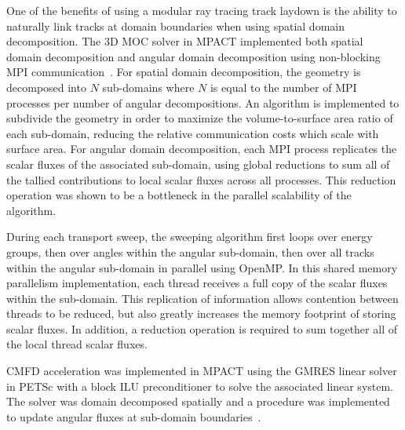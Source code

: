 One of the benefits of using a modular ray tracing track laydown is the ability to naturally link tracks at domain boundaries when using spatial domain decomposition. The 3D \ac{MOC} solver in MPACT implemented both spatial domain decomposition and angular domain decomposition using non-blocking \ac{MPI} communication~\cite{mpi}. For spatial domain decomposition, the geometry is decomposed into $N$ sub-domains where $N$ is equal to the number of \ac{MPI} processes per number of angular decompositions. An algorithm is implemented to subdivide the geometry in order to maximize the volume-to-surface area ratio of each sub-domain, reducing the relative communication costs which scale with surface area. For angular domain decomposition, each \ac{MPI} process replicates the scalar fluxes of the associated sub-domain, using global reductions to sum all of the tallied contributions to local scalar fluxes across all processes. This reduction operation was shown to be a bottleneck in the parallel scalability of the algorithm.

During each transport sweep, the sweeping algorithm first loops over energy groups, then over angles within the angular sub-domain, then over all tracks within the angular sub-domain in parallel using OpenMP. In this shared memory parallelism implementation, each thread receives a full copy of the scalar fluxes within the sub-domain. This replication of information allows contention between threads to be reduced, but also greatly increases the memory footprint of storing scalar fluxes. In addition, a reduction operation is required to sum together all of the local thread scalar fluxes.



\ac{CMFD} acceleration was implemented in MPACT using the \ac{GMRES} linear solver in PETSc with a block ILU preconditioner to solve the associated linear system. The solver was domain decomposed spatially and a procedure was implemented to update angular fluxes at sub-domain boundaries~\cite{mpact_dd_cmfd}.

